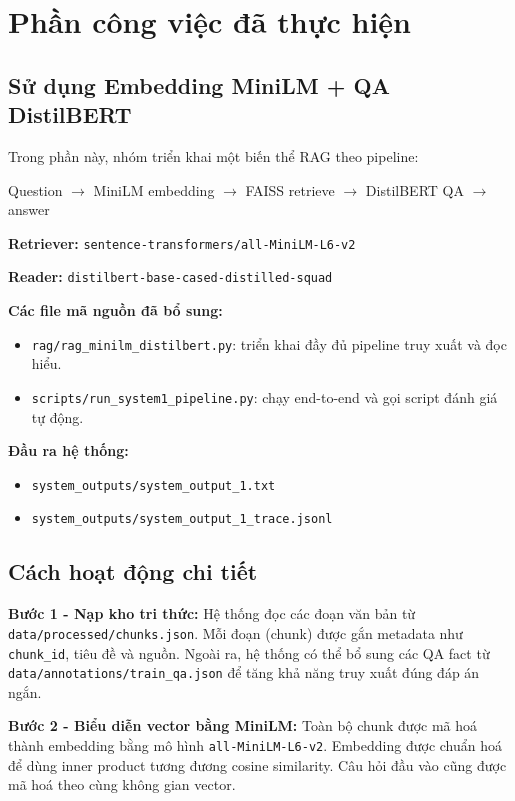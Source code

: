 \documentclass[12pt,a4paper]{report}
\begin{document}
\chapter{Phần công việc đã thực hiện}

\section{Sử dụng Embedding MiniLM + QA DistilBERT}

Trong phần này, nhóm triển khai một biến thể RAG theo pipeline:

\begin{center}
Question $\rightarrow$ MiniLM embedding $\rightarrow$ FAISS retrieve $\rightarrow$ DistilBERT QA $\rightarrow$ answer
\end{center}

\textbf{Retriever:} \texttt{sentence-transformers/all-MiniLM-L6-v2}

\textbf{Reader:} \texttt{distilbert-base-cased-distilled-squad}

\textbf{Các file mã nguồn đã bổ sung:}
\begin{itemize}
    \item \texttt{rag/rag\_minilm\_distilbert.py}: triển khai đầy đủ pipeline truy xuất và đọc hiểu.
    \item \texttt{scripts/run\_system1\_pipeline.py}: chạy end-to-end và gọi script đánh giá tự động.
\end{itemize}

\textbf{Đầu ra hệ thống:}
\begin{itemize}
    \item \texttt{system\_outputs/system\_output\_1.txt}
    \item \texttt{system\_outputs/system\_output\_1\_trace.jsonl}
\end{itemize}

\section{Cách hoạt động chi tiết}

\textbf{Bước 1 - Nạp kho tri thức:}
Hệ thống đọc các đoạn văn bản từ \texttt{data/processed/chunks.json}. Mỗi đoạn (chunk) được gắn metadata như \texttt{chunk\_id}, tiêu đề và nguồn. Ngoài ra, hệ thống có thể bổ sung các QA fact từ \texttt{data/annotations/train\_qa.json} để tăng khả năng truy xuất đúng đáp án ngắn.

\textbf{Bước 2 - Biểu diễn vector bằng MiniLM:}
Toàn bộ chunk được mã hoá thành embedding bằng mô hình \texttt{all-MiniLM-L6-v2}. Embedding được chuẩn hoá để dùng inner product tương đương cosine similarity. Câu hỏi đầu vào cũng được mã hoá theo cùng không gian vector.
\end{document}
